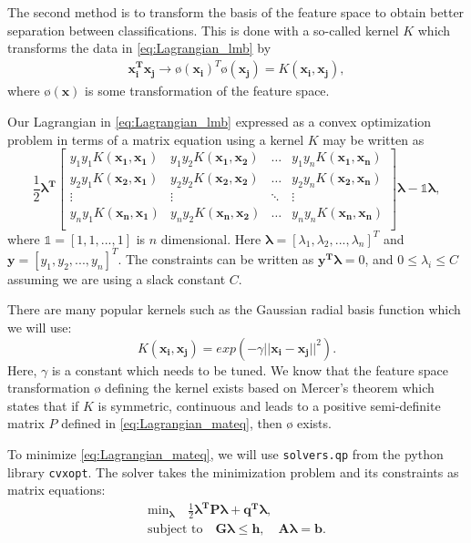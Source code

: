 The second method is to transform the basis of the feature space to obtain 
better separation between classifications. This is done with a so-called 
kernel $K$ which transforms the data in \autoref{eq:Lagrangian_lmb} by 
\begin{gather*}
\boldsymbol{x_i^Tx_j} \rightarrow ø(\boldsymbol{x_i})^Tø(\boldsymbol{x_j})=K(\boldsymbol{x_i,x_j}),
\end{gather*}
where $ø(\boldsymbol{x})$ is some transformation of the feature space.

Our Lagrangian in \autoref{eq:Lagrangian_lmb} expressed as a convex optimization 
problem in terms of a matrix equation using a kernel $K$ may be written as 
\begin{equation}
\frac{1}{2}\boldsymbol{\lambda ^T}
\begin{bmatrix}
	 y_1y_1K(\boldsymbol{x_1,x_1})  & y_1y_2K(\boldsymbol{x_1,x_2}) & \hdots & y_1y_nK(\boldsymbol{x_1,x_n}) \\
	 y_2y_1K(\boldsymbol{x_2,x_1})  & y_2y_2K(\boldsymbol{x_2,x_2}) & \hdots & y_2y_nK(\boldsymbol{x_2,x_n}) \\
	\vdots & \vdots & \ddots & \vdots \\
	 y_ny_1K(\boldsymbol{x_n,x_1})  & y_ny_2K(\boldsymbol{x_n,x_2}) & \hdots & y_ny_nK(\boldsymbol{x_n,x_n}) \\
\end{bmatrix}
\boldsymbol{\lambda }-\mathbb{1}\boldsymbol{\lambda },
\label{eq:Lagrangian_mateq}
\end{equation}
where $\mathbb{1}=[1,1,...,1]$ is $n$ dimensional. Here $\boldsymbol{\lambda }=[\lambda _1,\lambda _2,...,\lambda _n]^T$ 
and $\boldsymbol{y}=[y_1,y_2,...,y_n]^T$. The constraints can be written as 
$\boldsymbol{y^T\lambda }=0$, and $0 \le \lambda _i \le C$ assuming we are using 
a slack constant $C$.  

There are many popular kernels such as the Gaussian radial basis function which 
we will use:
\begin{equation}
K(\boldsymbol{x_i,x_j})=exp(-\gamma ||\boldsymbol{x_i-x_j}||^2).
\label{eq:grbf}
\end{equation}
Here, $\gamma $ is a constant which needs to be tuned.
We know that the feature space transformation $ø$ defining the kernel exists based 
on Mercer's theorem which states that if $K$ is symmetric, continuous and leads to 
a positive semi-definite matrix $P$ defined in \autoref{eq:Lagrangian_mateq}, then 
$ø$ exists. 

To minimize \autoref{eq:Lagrangian_mateq}, we will use \verb|solvers.qp| from
the python library \verb|cvxopt|. The solver takes the minimization problem 
and its constraints as matrix equations:
\begin{equation}
	\begin{split}
		\text{min}_{\boldsymbol{\lambda }}\quad \frac{1}{2}\boldsymbol{\lambda ^TP\lambda +q^T\lambda },\\
	\text{subject to}\quad \boldsymbol{G \lambda  \le h}, \quad \boldsymbol{A \lambda =b}.
	\end{split}
	\label{eq:solver_eq}
\end{equation}

